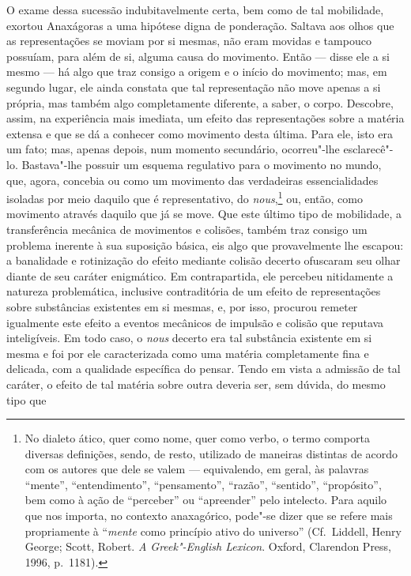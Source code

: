 O exame dessa sucessão indubitavelmente certa, bem como de tal mobilidade,
exortou Anaxágoras a uma hipótese digna de ponderação. Saltava aos olhos que
as representações se moviam por si mesmas, não eram movidas e tampouco
possuíam, para além de si, alguma causa do movimento. Então --- disse ele a si
mesmo --- há algo que traz consigo a origem e o início do movimento; mas, em
segundo lugar, ele ainda \label{aorigemeoinicio} constata que tal
representação não move apenas a si própria, mas \label{asipropria} também
algo completamente diferente, a saber, o corpo. Descobre, assim, na
experiência mais imediata, um efeito das representações sobre a matéria
extensa e que se dá a conhecer como movimento desta última. Para ele, isto
era um fato; mas, apenas depois, num momento secundário, ocorreu"-lhe
esclarecê"-lo. Bastava"-lhe possuir um esquema regulativo para o movimento no
mundo, que, agora, concebia ou como um movimento das verdadeiras
essencialidades isoladas por meio daquilo que é representativo, do \textit{nous},\footnote{No 
dialeto ático, quer como nome, quer como verbo, o termo
comporta diversas definições, sendo, de resto, utilizado de maneiras
distintas de acordo com os autores que dele se valem --- equivalendo, em
geral, às palavras ``mente'', ``entendimento'', ``pensamento'', ``razão'',
``sentido'', ``propósito'', bem como à ação de ``perceber'' ou ``apreender''
pelo intelecto. Para aquilo que nos importa, no contexto anaxagórico,
pode"-se dizer que se refere mais propriamente à ``\textit{mente} como
princípio ativo do universo'' (Cf.~Liddell, Henry George; Scott,
Robert. \textit{A Greek"-English Lexicon}. Oxford, Clarendon Press, 1996,
p.~1181).} ou, então, como movimento através daquilo que já se move. Que este
último tipo de mobilidade, a transferência mecânica de movimentos e colisões,
também traz consigo um problema inerente à sua suposição básica, eis algo que
provavelmente lhe escapou: a banalidade e rotinização do efeito mediante
colisão decerto ofuscaram seu olhar diante de seu caráter enigmático. Em
contrapartida, ele percebeu nitidamente a natureza problemática, inclusive
contraditória de um efeito de representações sobre substâncias existentes em
si mesmas, e, por isso, procurou remeter igualmente este efeito a eventos
mecânicos de impulsão e colisão que reputava inteligíveis. Em todo caso,
o \textit{nous} decerto era tal substância existente em si mesma e foi por
ele caracterizada como uma matéria completamente fina e delicada, com a
qualidade específica do pensar. Tendo em vista a admissão de tal caráter, o
efeito de tal matéria sobre outra deveria ser, sem dúvida, do mesmo tipo que
